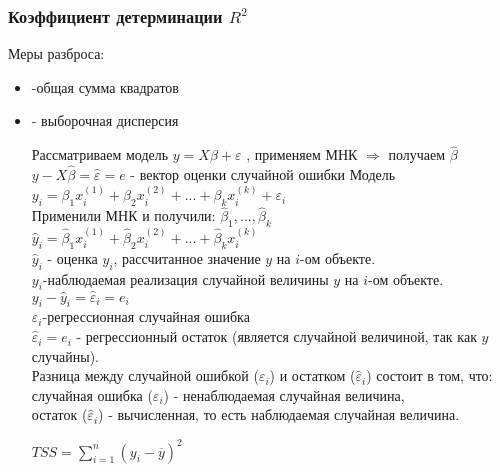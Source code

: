 \documentclass{article}
\begin{document}
\subsubsection{Коэффициент детерминации $R^2$}
Меры разброса:
\begin{itemize}
\item {} -общая сумма квадратов\\
\item {} - выборочная дисперсия\\


\vspace{1ex}

Рассматриваем модель $y=X\beta+\varepsilon$ , применяем МНК $\Rightarrow$ получаем $\hat{\beta}$\\
$y-X\hat{\beta}=\hat{\varepsilon}=e$ - вектор оценки случайной ошибки
\vspace{2ex}
Модель $y_i = \beta_1x_i^{(1)} + \beta_2x_i^{(2)} + ...+\beta_kx_i^{(k)}+\varepsilon_i$\\
Применили МНК и получили: $\hat{\beta}_1,...,\hat{\beta}_k$\\
$\hat{y}_i = \hat{\beta}_1x_i^{(1)} + \hat{\beta}_2x_i^{(2)} + ...+\hat{\beta}_kx_i^{(k)}$\\ $\hat{y}_i$ - оценка $y_i$, рассчитанное значение $y$ на $i$-ом объекте.\\
$y_i$-наблюдаемая реализация случайной величины $y$ на $i$-ом объекте.\\
$y_i-\hat{y}_i=\hat{\varepsilon}_i=e_i$\\
$\varepsilon_i$-регрессионная случайная ошибка\\
$\hat{\varepsilon}_i=e_i$ - регрессионный остаток (является случайной величиной, так как $y$ случайны).\\

Разница между случайной ошибкой ($\varepsilon_i$) и остатком ($\hat{\varepsilon}_i$) состоит в том, что:\\ случайная ошибка ($\varepsilon_i$) - ненаблюдаемая случайная величина,\\ остаток ($\hat{\varepsilon}_i$) - вычисленная, то есть наблюдаемая случайная величина.
\vspace{2ex}

$TSS=\sum\limits_{i=1}^n(y_i-\overline{y})^2$\\


\end{itemize}
\end{document}
